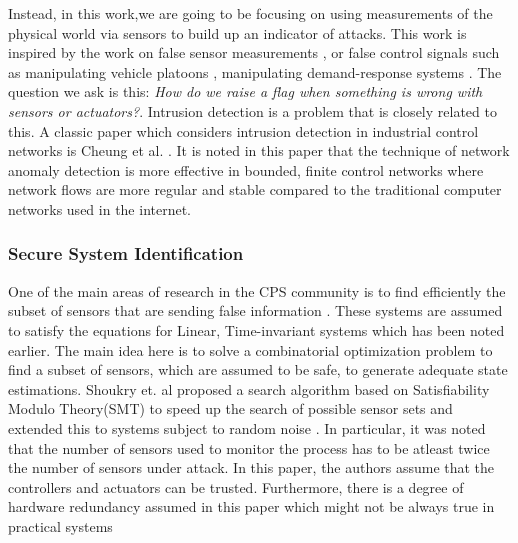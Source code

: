 Instead, in this work,we are going to be focusing on using measurements of the physical world via sensors to build up an indicator of attacks. This work is inspired by the work on false sensor measurements \cite{liu2011false}, or false control signals such as manipulating vehicle platoons \cite{gerdes2013cps}, manipulating demand-response systems \cite{tan2013impact}. The question we ask is this: \textit{How do we raise a flag when something is wrong with sensors or actuators?}. Intrusion detection is a problem that is closely related to this. A classic paper which considers intrusion detection in industrial control networks is Cheung et al. \cite{cheung2007using}. It is noted in this paper that the technique of network anomaly detection is more effective in bounded, finite control networks where network flows are more regular and stable compared to the traditional computer networks used in the internet.

\subsubsection{Secure System Identification} One of the main areas of research in the CPS community is to find efficiently the subset of sensors that are sending false information \cite{chong2015observability}. These systems are assumed to satisfy the equations for Linear, Time-invariant systems which has been noted earlier. The main idea here is to solve a combinatorial optimization problem to find a subset of sensors, which are assumed to be safe, to generate adequate state estimations. Shoukry et. al \cite{shoukry2018smt} proposed a search algorithm based on Satisfiability Modulo Theory(SMT) to speed up the search of possible sensor sets and extended this to systems subject to random noise \cite{mishra2017secure}. In particular, it was noted that the number of sensors used to monitor the process has to be atleast twice the number of sensors under attack. In this paper, the authors  assume that the controllers and actuators can be trusted. Furthermore, there is a degree of hardware redundancy assumed in this paper which might not be always true in practical systems

